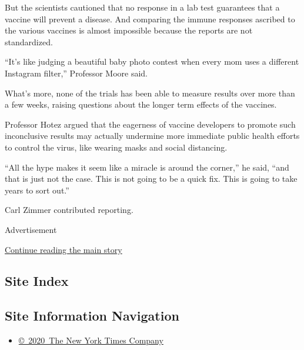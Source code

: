 But the scientists cautioned that no response in a lab test guarantees
that a vaccine will prevent a disease. And comparing the immune
responses ascribed to the various vaccines is almost impossible because
the reports are not standardized.

``It's like judging a beautiful baby photo contest when every mom uses a
different Instagram filter,'' Professor Moore said.

What's more, none of the trials has been able to measure results over
more than a few weeks, raising questions about the longer term effects
of the vaccines.

Professor Hotez argued that the eagerness of vaccine developers to
promote such inconclusive results may actually undermine more immediate
public health efforts to control the virus, like wearing masks and
social distancing.

``All the hype makes it seem like a miracle is around the corner,'' he
said, ``and that is just not the case. This is not going to be a quick
fix. This is going to take years to sort out.''

Carl Zimmer contributed reporting.

Advertisement

\protect\hyperlink{after-bottom}{Continue reading the main story}

\hypertarget{site-index}{%
\subsection{Site Index}\label{site-index}}

\hypertarget{site-information-navigation}{%
\subsection{Site Information
Navigation}\label{site-information-navigation}}

\begin{itemize}
\tightlist
\item
  \href{https://help.nytimes.com/hc/en-us/articles/115014792127-Copyright-notice}{©~2020~The
  New York Times Company}
\end{itemize}

